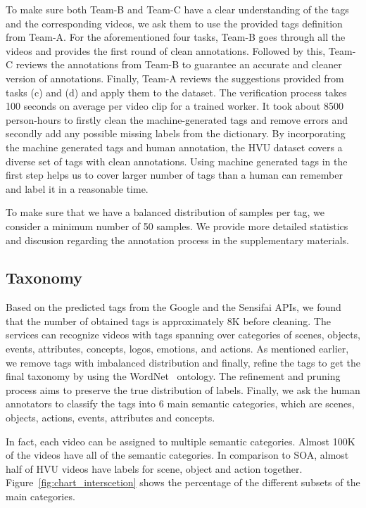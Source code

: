 \documentclass[runningheads]{llncs}
\begin{document}
To make sure both Team-B and Team-C have a clear understanding of the tags and the corresponding videos, we ask them to use the provided tags definition from Team-A. For the aforementioned four tasks, Team-B goes through all the videos and provides the first round of clean annotations. Followed by this, Team-C reviews the annotations from Team-B to guarantee an accurate and cleaner version of annotations. Finally, Team-A reviews the suggestions provided from tasks (c) and (d) and apply them to the dataset.
The verification process takes 100 seconds on average per video clip for a trained worker.
It took about 8500 person-hours to firstly clean the machine-generated tags and remove errors and secondly add any possible missing labels from the dictionary.     
By incorporating the machine generated tags and human annotation, the HVU dataset covers a diverse set of tags with clean annotations. Using machine generated tags in the first step helps us to cover larger number of tags than a human can remember and label it in a reasonable time. 

To make sure that we have a balanced distribution of samples per tag, we consider a minimum number of 50 samples.
\fi
We provide more detailed statistics and discusion regarding the annotation process in the supplementary materials.




\subsection{Taxonomy}
Based on the predicted tags from the Google and the Sensifai APIs, we found that the number of obtained tags is approximately 8K before cleaning. The services can recognize videos with tags spanning over categories of scenes, objects, events, attributes, concepts, logos, emotions, and actions. As mentioned earlier, we remove tags with imbalanced distribution and finally, refine the tags to get the final taxonomy by using the WordNet~\cite{wordnet} ontology. The refinement and pruning process aims to preserve the true distribution of labels. Finally, we ask the human annotators to classify the tags into 6 main semantic categories, which are scenes, objects, actions, events, attributes and concepts.

In fact, each video can be assigned to multiple semantic categories. 
Almost 100K of the videos have all of the semantic categories. In comparison to SOA, almost half of HVU videos have labels for scene, object and action together. Figure~\ref{fig:chart_interscetion} shows the percentage of the different subsets of the main categories.
\end{document}
